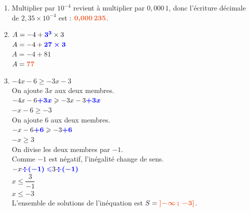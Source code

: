 \documentclass[a4paper,11pt]{article}
\begin{document}
{\begin{seanceD}{}
\begin{enumerate}
\begin{tikzpicture}[baseline,scale = 0.75]
\end{tikzpicture}


\item  Multiplier par  $10^{-4}$ revient à multiplier par $0{,}000\,1$,  donc l'écriture décimale de $2{,}35\times 10^{-4}$ est : ${\color[HTML]{f15929}\boldsymbol{0{,}000\,235}}$.


\item  $A          =-4 + {\color{blue}\boldsymbol{3^3}} \times 3$\\$A=-4 + {\color{blue}\boldsymbol{27\times3}}$\\$A=-4+81$\\$A = {\color[HTML]{f15929}\boldsymbol{77}}$


\item 
 $-4x-6\geqslant -3x-3$\\On ajoute $3x$ aux deux membres.\\$-4x-6{\color{blue}\boldsymbol{+3x}}
          \geqslant-3x-3{\color{blue}\boldsymbol{+3x}}$\\$-x-6\geqslant-3$\\On ajoute $6$ aux deux membres.\\$-x-6{\color{blue}\boldsymbol{+6}}
          \geqslant-3{\color{blue}\boldsymbol{+6}}$\\$-x\geqslant3$\\On divise les deux membres par $-1$.\\Comme $-1$ est négatif, l'inégalité change de sens.\\$-x{\color{blue}\boldsymbol{\div(-1)\leqslant}}3{\color{blue}\boldsymbol{\div(-1)}}$\\$x\leqslant\dfrac{3}{-1}$\\$x\leqslant-3$\\ L'ensemble de solutions de l'inéquation est $S = {\color[HTML]{f15929}\boldsymbol{\left] -\infty\,;\,-3\right]}}$.

\end{enumerate}
\end{seanceD}}
\end{document}
